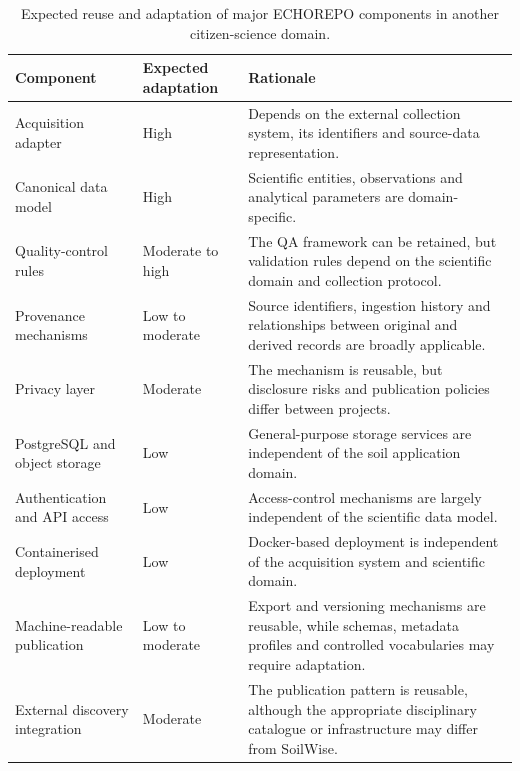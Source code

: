 \begin{table}[htbp]
    \centering
    \caption{Expected reuse and adaptation of major ECHOREPO components
    in another citizen-science domain.}
    \label{tab:reusability}
    \begin{tabular}{p{} p{} p{}}
        \toprule
        Component & Expected adaptation & Rationale \\
        \midrule

        Acquisition adapter &
        High &
        Depends on the external collection system, its identifiers and
        source-data representation. \\

        Canonical data model &
        High &
        Scientific entities, observations and analytical parameters are
        domain-specific. \\

        Quality-control rules &
        Moderate to high &
        The QA framework can be retained, but validation rules depend on
        the scientific domain and collection protocol. \\

        Provenance mechanisms &
        Low to moderate &
        Source identifiers, ingestion history and relationships between
        original and derived records are broadly applicable. \\

        Privacy layer &
        Moderate &
        The mechanism is reusable, but disclosure risks and publication
        policies differ between projects. \\

        PostgreSQL and object storage &
        Low &
        General-purpose storage services are independent of the soil
        application domain. \\

        Authentication and API access &
        Low &
        Access-control mechanisms are largely independent of the scientific
        data model. \\

        Containerised deployment &
        Low &
        Docker-based deployment is independent of the acquisition system
        and scientific domain. \\

        Machine-readable publication &
        Low to moderate &
        Export and versioning mechanisms are reusable, while schemas,
        metadata profiles and controlled vocabularies may require adaptation. \\

        External discovery integration &
        Moderate &
        The publication pattern is reusable, although the appropriate
        disciplinary catalogue or infrastructure may differ from SoilWise. \\

        \bottomrule
    \end{tabular}
\end{table}

